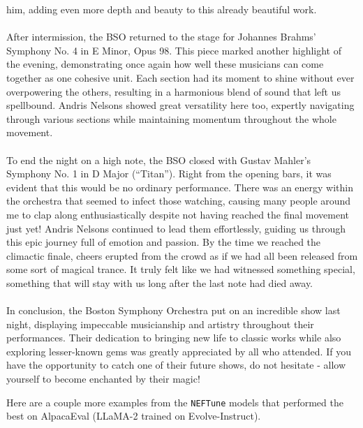 \documentclass{article} %
\newcommand{\neftune}{\texttt{NEFTune}}
\newcommand{\llama}{LLaMA}
\begin{document}
\begin{tcolorbox}[breakable,boxrule=0pt]
him, adding even more depth and beauty to this already beautiful work.\\\\After intermission, the BSO returned to the stage for Johannes Brahms' Symphony No. 4 in E Minor, Opus 98. This piece marked another highlight of the evening, demonstrating once again how well these musicians can come together as one cohesive unit. Each section had its moment to shine without ever overpowering the others, resulting in a harmonious blend of sound that left us spellbound. Andris Nelsons showed great versatility here too, expertly navigating through various sections while maintaining momentum throughout the whole movement.\\\\To end the night on a high note, the BSO closed with Gustav Mahler's Symphony No. 1 in D Major (``Titan''). Right from the opening bars, it was evident that this would be no ordinary performance. There was an energy within the orchestra that seemed to infect those watching, causing many people around me to clap along enthusiastically despite not having reached the final movement just yet! Andris Nelsons continued to lead them effortlessly, guiding us through this epic journey full of emotion and passion. By the time we reached the climactic finale, cheers erupted from the crowd as if we had all been released from some sort of magical trance. It truly felt like we had witnessed something special, something that will stay with us long after the last note had died away.\\\\In conclusion, the Boston Symphony Orchestra put on an incredible show last night, displaying impeccable musicianship and artistry throughout their performances. Their dedication to bringing new life to classic works while also exploring lesser-known gems was greatly appreciated by all who attended. If you have the opportunity to catch one of their future shows, do not hesitate - allow yourself to become enchanted by their magic!
\end{tcolorbox}

Here are a couple more examples from the \neftune{} models that performed the best on AlpacaEval (\llama{}-2 trained on Evolve-Instruct).
\end{document}

